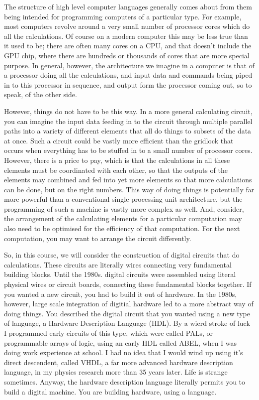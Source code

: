 \documentclass[../physical_computing.tex]{subfiles}
\begin{document}
The structure of high level computer languages generally comes about from them being intended for programming computers of a particular type. For example, most computers revolve around a very small number of processor cores which do all the calculations. Of course on a modern computer this may be less true than it used to be; there are often many cores on a CPU, and that doesn't include the GPU chip, where there are hundreds or thousands of cores that are more special purpose. In general, however, the architecture we imagine in a computer is that of a processor doing all the calculations, and input data and commands being piped in to this processor in sequence, and output form the processor coming out, so to speak, of the other side.

However, things do not have to be this way. In a more general calculating circuit, you can imagine the input data feeding in to the circuit through multiple parallel paths into a variety of different elements that all do things to subsets of the data at once. Such a circuit could be vastly more efficient than the gridlock that occurs when everything has to be stuffed in to a small number of processor cores. However, there is a price to pay, which is that the calculations in all these elements must be coordinated with each other, so that the outputs of the elements may combined and fed into yet more elements so that more calculations can be done, but on the right numbers. This way of doing things is potentially far more powerful than a conventional single processing unit architecture, but the programming of such a machine is vastly more complex as well. And, consider, the arrangement of the calculating elements for a particular computation may also need to be optimised for the efficiency of that computation. For the next computation, you may want to arrange the circuit differently.

So, in this course, we will consider the construction of digital circuits that do calculations. These circuits are literally wires connecting very fundamental building blocks. Until the 1980s. digital circuits were assembled using literal physical wires or circuit boards, connecting these fundamental blocks together. If you wanted a new circuit, you had to build it out of hardware. In the 1980s, however, large scale integration of digitial hardware led to a more abstract way of doing things. You described the digital circuit that you wanted using a new type of language, a Hardware Description Language (HDL). By a wierd stroke of luck I programmed early circuits of this type, which were called PALs, or programmable arrays of logic, using an early HDL called ABEL, when I was doing work experience at school. I had no idea that I would wind up using it's direct descendent, called VHDL, a far more advanced hardware description language, in my physics research more than 35 years later. Life is strange sometimes. Anyway, the hardware description language literally permits you to build a digital machine. You are building hardware, using a language.
\end{document}
